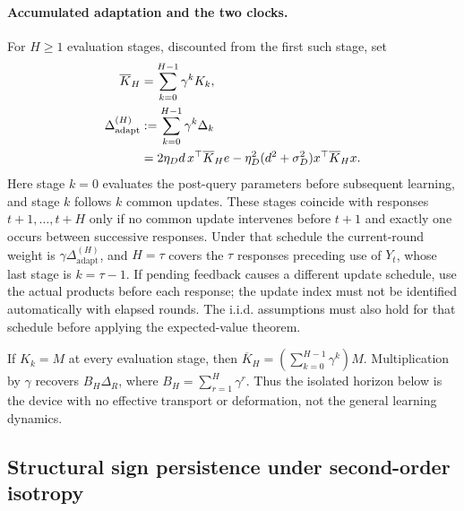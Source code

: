 \paragraph{Accumulated adaptation and the two clocks.}
For $H\geq1$ evaluation stages, discounted from the first such stage, set
\begin{align}
    \overline K_H&=\sum_{k=0}^{H-1}\gamma^kK_k,\\
    \Delta_{\mathrm{adapt}}^{(H)}
    &:=\sum_{k=0}^{H-1}\gamma^k\Delta_k\notag\\
    &=2\eta_D d\,x^\top\overline K_He
       -\eta_D^2(d^2+\sigma_D^2)x^\top\overline K_Hx.
    \label{eq:accumulated-transport}
\end{align}
Here stage $k=0$ evaluates the post-query parameters before subsequent
learning, and stage $k$ follows $k$ common updates. These stages coincide
with responses $t+1,\ldots,t+H$ only if no common update intervenes before
$t+1$ and exactly one occurs between successive responses. Under that
schedule the current-round weight is
$\gamma\Delta_{\mathrm{adapt}}^{(H)}$, and $H=\tau$ covers the
$\tau$ responses preceding use of $Y_t$, whose last stage is $k=\tau-1$.
If pending feedback causes a different update schedule, use the actual
products before each response; the update index must not be identified
automatically with elapsed rounds. The i.i.d. assumptions must also hold
for that schedule before applying the expected-value theorem.

If $K_k=M$ at every evaluation stage, then
$\overline K_H=(\sum_{k=0}^{H-1}\gamma^k)M$. Multiplication by $\gamma$
recovers $B_H\Delta_R$, where $B_H=\sum_{r=1}^H\gamma^r$.
Thus the isolated horizon below is the device with no effective transport
or deformation, not the general learning dynamics.

\subsection{Structural sign persistence under second-order isotropy}
\label{sec:structural-persistence}

